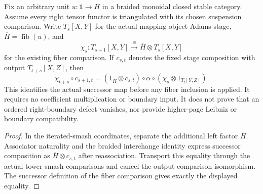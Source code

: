 \begin{proposition}
  \label{prop:moss-stage-composition-successor}
  \leanok
  Fix an arbitrary unit $u:\mathbb 1\to H$ in a braided monoidal closed
  stable category.  Assume every right tensor functor is triangulated with
  its chosen suspension comparison.  Write $T_s[X,Y]$ for the actual
  mapping-object Adams stage, $\overline H=\operatorname{fib}(u)$, and
  \[
    \chi_s:T_{s+1}[X,Y]\xrightarrow{\ \cong\ }
      \overline H\otimes T_s[X,Y]
  \]
  for the existing fiber comparison.  If $c_{s,t}$ denotes the fixed
  stage composition with output $T_{t+s}[X,Z]$, then
  \[
    \chi_{t+s}\circ c_{s+1,t}
      =(1_{\overline H}\otimes c_{s,t})\circ\alpha
        \circ(\chi_s\otimes1_{T_t[Y,Z]}).
  \]
  This identifies the actual successor map before any fiber inclusion is
  applied.  It requires no coefficient multiplication or boundary input.
  It does not prove that an ordered right-boundary defect vanishes, nor
  provide higher-page Leibniz or boundary compatibility.
\end{proposition}
\begin{proof}
  \leanok
  In the iterated-smash coordinates, separate the additional left factor
  $\overline H$.  Associator naturality and the braided interchange
  identity express successor composition as
  $\overline H\otimes c_{s,t}$ after reassociation.  Transport this
  equality through the actual tower-smash comparisons and cancel the
  output comparison isomorphism.  The successor definition of the fiber
  comparison gives exactly the displayed equality.
\end{proof}

